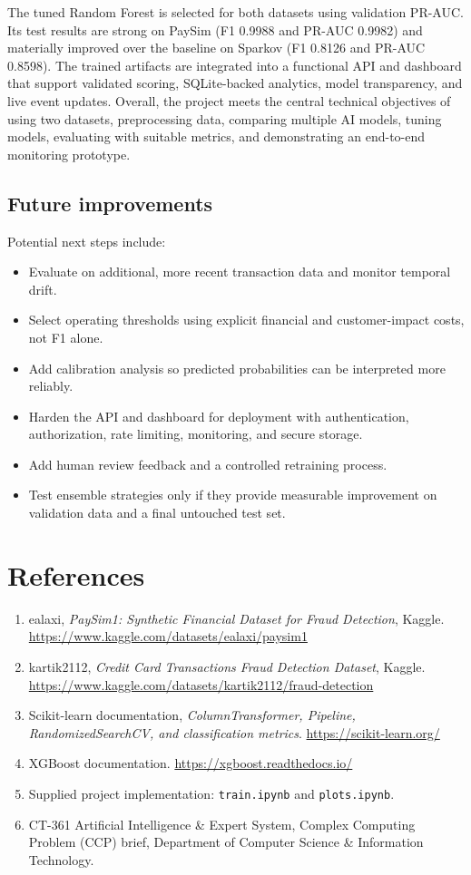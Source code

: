 \documentclass[12pt,a4paper]{report}
\begin{document}
The tuned Random Forest is selected for both datasets using validation PR-AUC. Its test results are strong on PaySim (F1 0.9988 and PR-AUC 0.9982) and materially improved over the baseline on Sparkov (F1 0.8126 and PR-AUC 0.8598). The trained artifacts are integrated into a functional API and dashboard that support validated scoring, SQLite-backed analytics, model transparency, and live event updates. Overall, the project meets the central technical objectives of using two datasets, preprocessing data, comparing multiple AI models, tuning models, evaluating with suitable metrics, and demonstrating an end-to-end monitoring prototype.

\section{Future improvements}
Potential next steps include:
\begin{itemize}
  \item Evaluate on additional, more recent transaction data and monitor temporal drift.
  \item Select operating thresholds using explicit financial and customer-impact costs, not F1 alone.
  \item Add calibration analysis so predicted probabilities can be interpreted more reliably.
  \item Harden the API and dashboard for deployment with authentication, authorization, rate limiting, monitoring, and secure storage.
  \item Add human review feedback and a controlled retraining process.
  \item Test ensemble strategies only if they provide measurable improvement on validation data and a final untouched test set.
\end{itemize}

\chapter*{References}
\begin{enumerate}
  \item ealaxi, \textit{PaySim1: Synthetic Financial Dataset for Fraud Detection}, Kaggle. \url{https://www.kaggle.com/datasets/ealaxi/paysim1}
  \item kartik2112, \textit{Credit Card Transactions Fraud Detection Dataset}, Kaggle. \url{https://www.kaggle.com/datasets/kartik2112/fraud-detection}
  \item Scikit-learn documentation, \textit{ColumnTransformer, Pipeline, RandomizedSearchCV, and classification metrics}. \url{https://scikit-learn.org/}
  \item XGBoost documentation. \url{https://xgboost.readthedocs.io/}
  \item Supplied project implementation: \texttt{train.ipynb} and \texttt{plots.ipynb}.
  \item CT-361 Artificial Intelligence \& Expert System, Complex Computing Problem (CCP) brief, Department of Computer Science \& Information Technology.
\end{enumerate}
\end{document}
